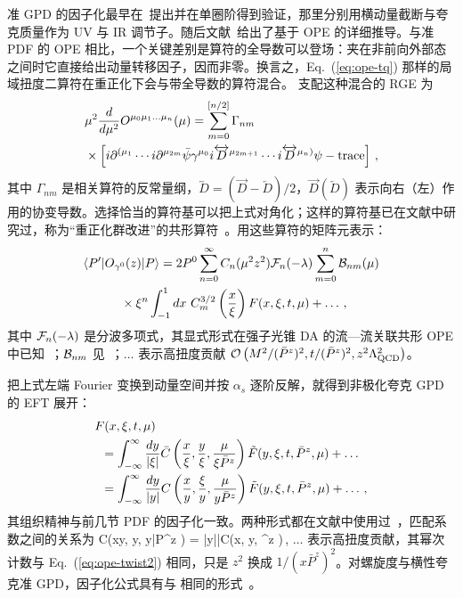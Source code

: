 准 GPD 的因子化最早在~\cite{Ji:2015qla,Xiong:2015nua}提出并在单圈阶得到验证，那里分别用横动量截断与夸克质量作为 UV 与 IR 调节子。随后文献~\cite{Liu:2019urm}给出了基于 OPE 的详细推导。与准 PDF 的 OPE 相比，一个关键差别是算符的全导数可以登场：夹在非前向外部态之间时它直接给出动量转移因子，因而非零。换言之，Eq.~(\ref{eq:ope-tq}) 那样的局域扭度二算符在重正化下会与带全导数的算符混合。
%
支配这种混合的 RGE 为~\cite{Braun:2003rp}
\begin{align} \label{eq:rge}
	&\mu^2 {d\over d\mu^2}O^{{\mu}_0 {\mu}_1 \ldots {\mu}_n}(\mu) = \sum_{m=0}^{[n/2]}\Gamma_{nm}\\
	&\times\left[i\partial^{(\mu_1}\cdots i\partial^{\mu_{2m}} \bar{\psi} \gamma^{\mu_0}i\overleftrightarrow{D}^{\mu_{2m+1}}\cdots i\overleftrightarrow{D}^{\mu_n)}\psi-{\rm trace}\right]\,,\nonumber
\end{align}
其中 $\Gamma_{nm}$ 是相关算符的反常量纲，$\overleftrightarrow{D}=(\overrightarrow{D}-\overleftarrow{D})/2$，$\overrightarrow{D} (\overleftarrow{D})$ 表示向右（左）作用的协变导数。选择恰当的算符基可以把上式对角化；这样的算符基已在文献中研究过，称为``重正化群改进''的共形算符~\cite{Braun:2003rp,Mueller:1993hg}。用这些算符的矩阵元表示：
\begin{align}\label{eq:ope-twist2}
	&\langle P'|{O}_{\gamma^0}(z)|P\rangle  =  2P^0\sum_{n=0}^\infty C_n ({\mu}^2 z^2){\cal F}_n(-\lambda)\sum_{m=0}^n{\cal B}_{nm}(\mu)\nonumber\\
	&\hspace{3em}\times\xi^n\int_{-1}^1 dx\ C_m^{3/2}\left({x\over \xi}\right) F(x,\xi,t,\mu)+\ldots\,,
\end{align}
其中 ${\cal F}_n(-\lambda)$ 是分波多项式，其显式形式在强子光锥 DA 的流—流关联共形 OPE 中已知~\cite{Braun:2007wv}；${\cal B}_{nm}$ 见~\cite{Braun:2003rp,Mueller:1993hg}；$\ldots$ 表示高扭度贡献 $\mathcal{O}\left({M^2/ ({\bar P}^z)^2},{t/ ({\bar P}^z)^2},z^2\Lambda_{\rm QCD}^2\right)$。

把上式左端 Fourier 变换到动量空间并按 $\alpha_s$ 逐阶反解，就得到非极化夸克 GPD 的 EFT 展开：
\begin{align}\label{eq:gpdfact}
	&F(x,\xi,t,\mu) \\
	&\hspace{0.5em}=  \int_{-\infty}^\infty {dy\over |\xi|}\bar{C}\left({x\over \xi}, {y\over \xi}, {\mu \over \xi {\bar P}^z }\right){\tilde F}(y,\xi,t, {\bar P}^z,\mu) +\ldots\nonumber\\
	&\hspace{0.5em}= \int_{-\infty}^\infty {dy\over |y|}C\left({x\over y}, {\xi\over y}, {\mu \over y{\bar P}^z }\right){\tilde F}(y,\xi,t,{\bar P}^z,\mu)+ \ldots\,,\nonumber
\end{align}
其组织精神与前几节 PDF 的因子化一致。两种形式都在文献中使用过~\cite{Ji:2015qla,Xiong:2015nua,Liu:2019urm}，匹配系数之间的关系为
\beq
C\left({x\over y}, {\xi\over y}, {\mu \over y{\bar P}^z }\right) = \left|{y\over \xi}\right|\bar{C}\left({x\over \xi}, {y\over \xi}, {\mu \over {}^z }\right)\,,
\eeq
$\ldots$ 表示高扭度贡献，其幂次计数与 Eq.~(\ref{eq:ope-twist2}) 相同，只是 $z^2$ 换成 $1/(x{\bar P}^z)^2$。对螺旋度与横性夸克准 GPD，因子化公式具有与  相同的形式~\cite{Liu:2019urm}。

